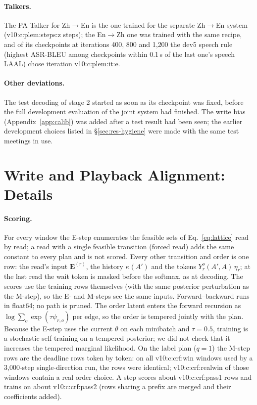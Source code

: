 \paragraph{Talkers.} The PA Talker for Zh$\rightarrow$En is the one trained for the separate Zh$\rightarrow$En system
(\num{v10:c:plem:steps:z} steps); the En$\rightarrow$Zh one was trained with the same recipe, and of its checkpoints at
iterations 400, 800 and 1{,}200 the dev5 speech rule (highest ASR-BLEU among checkpoints within 0.1\,s of the last
one's speech LAAL) chose iteration \num{v10:c:plem:it:e}.

\paragraph{Other deviations.} The test decoding of stage 2 started as soon as its checkpoint was fixed, before the full
development evaluation of the joint system had finished. The write bias (Appendix~\ref{app:calib}) was added after a test
result had been seen; the earlier development choices listed in \S\ref{sec:res-hygiene} were made with the same test
meetings in use.

\section{Write and Playback Alignment: Details}
\label{app:crf}

\paragraph{Scoring.} For every window the E-step enumerates the feasible sets of Eq.~\eqref{eq:lattice} read by read; a
read with a single feasible transition (forced read) adds the same constant to every plan and is not scored. Every other
transition and order is one row: the read's input $\bm{E}^{(r)}$, the history $\kappa(A')$ and the tokens
$Y_r^o(A',A)\,\eta_r$; at the last read the wait token is masked before the softmax, as at decoding. The scores use the
training rows themselves (with the same posterior perturbation as the M-step), so the E- and M-steps see the same inputs.
Forward--backward runs in float64; no path is pruned. The order latent enters the forward recursion as
$\log\sum_o\exp(\tau\psi_{r,o})$ per edge, so the order is tempered jointly with the plan. Because the E-step uses the
current $\theta$ on each minibatch and $\tau=0.5$, training is a stochastic self-training on a tempered posterior; we did
not check that it increases the tempered marginal likelihood. On the label plan ($q=1$) the M-step rows are the deadline rows
token by token: on all \num{v10:c:crf:win} windows used by a 3{,}000-step single-direction run, the rows were identical;
\num{v10:c:crf:realwin} of those windows contain a real order choice. A step scores about \num{v10:c:crf:pass1} rows
and trains on about \num{v10:c:crf:pass2} (rows sharing a prefix are merged and their coefficients added).

